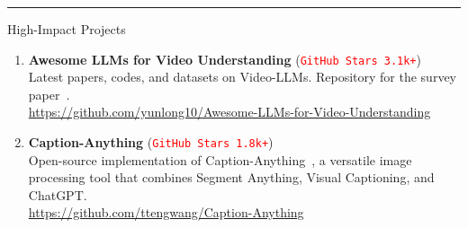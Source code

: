 \vspace{10pt}
\hrule
\begin{rSection}{High-Impact Projects}
    \begin{enumerate}[leftmargin=*]
              
        \item \textbf{Awesome LLMs for Video Understanding} (\texttt{\textcolor{red}{GitHub Stars 3.1k+}})\\
                  Latest papers, codes, and datasets on Video-LLMs. Repository for the survey paper~\cite{vidllmsurvey}. \\
                  \url{https://github.com/yunlong10/Awesome-LLMs-for-Video-Understanding}
        \item \textbf{Caption-Anything} (\texttt{\textcolor{red}{GitHub Stars 1.8k+}}) \\
              Open-source implementation of Caption-Anything~\cite{wang2023caption}, a versatile image processing tool that combines Segment Anything, Visual Captioning, and ChatGPT. \\
              \url{https://github.com/ttengwang/Caption-Anything}

    \end{enumerate}
\end{rSection}

              
                  
